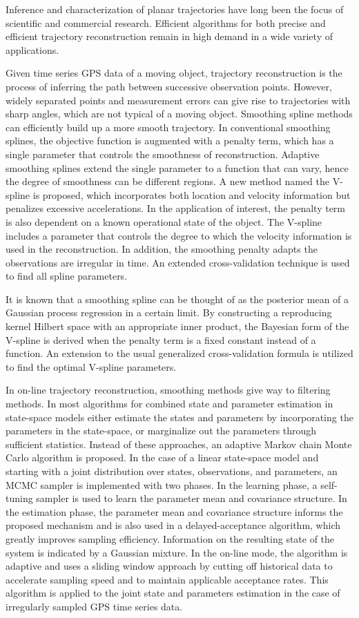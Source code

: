 
Inference and characterization of planar trajectories have long been the focus of scientific and commercial research. Efficient algorithms for both precise and efficient trajectory reconstruction remain in high demand in a wide variety of applications.

Given time series GPS data of a moving object, trajectory reconstruction is the process of inferring the path between successive observation points. However, widely separated points and measurement errors can give rise to trajectories with sharp angles, which are not typical of a moving object. Smoothing spline methods can efficiently build up a more smooth trajectory. In conventional smoothing splines, the objective function is augmented with a penalty term, which has a single parameter that controls the smoothness of reconstruction. Adaptive smoothing splines extend the single parameter to a function that can vary, hence the degree of smoothness can be different regions. A new method named the V-spline is proposed, which incorporates both location and velocity information but penalizes excessive accelerations. In the application of interest, the penalty term is also dependent on a known operational state of the object. The V-spline includes a parameter that controls the degree to which the velocity information is used in the reconstruction. In addition, the smoothing penalty adapts the observations are irregular in time. An extended cross-validation technique is used to find all spline parameters. 


It is known that a smoothing spline can be thought of as the posterior mean of a Gaussian process regression in a certain limit. By constructing a reproducing kernel Hilbert space with an appropriate inner product, the Bayesian form of the V-spline is derived when the penalty term is a fixed constant instead of a function. An extension to the usual generalized cross-validation formula is utilized to find the optimal V-spline parameters. 


In on-line trajectory reconstruction, smoothing methods give way to filtering methods. In most algorithms for combined state and parameter estimation in state-space models either estimate the states and parameters by incorporating the parameters in the state-space, or marginalize out the parameters through sufficient statistics. Instead of these approaches, an adaptive Markov chain Monte Carlo algorithm is proposed. In the case of a linear state-space model and starting with a joint distribution over states, observations, and parameters, an MCMC sampler is implemented with two phases. In the learning phase, a self-tuning sampler is used to learn the parameter mean and covariance structure. In the estimation phase, the parameter mean and covariance structure informs the proposed mechanism and is also used in a delayed-acceptance algorithm, which greatly improves sampling efficiency. Information on the resulting state of the system is indicated by a Gaussian mixture. In the on-line mode, the algorithm is adaptive and uses a sliding window approach by cutting off historical data to accelerate sampling speed and to maintain applicable acceptance rates. This algorithm is applied to the joint state and parameters estimation in the case of irregularly sampled GPS time series data. 
